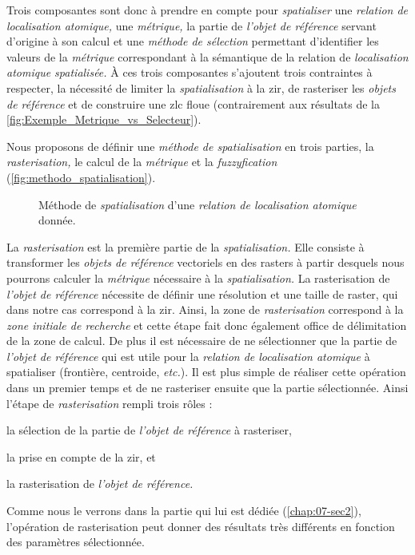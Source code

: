 
Trois composantes sont donc à prendre en compte pour
\emph{spatialiser} une \emph{relation de localisation atomique,} une
\emph{métrique,} la partie de \emph{l'objet de référence} servant
d'origine à son calcul et une \emph{méthode de sélection} permettant
d'identifier les valeurs de la \emph{métrique} correspondant à la
sémantique de la relation de \emph{localisation atomique spatialisée.}
À ces trois composantes s'ajoutent trois contraintes à respecter, la
nécessité de limiter la \emph{spatialisation} à la \ac{zir}, de
rasteriser les \emph{objets de référence} et de construire une
\ac{zlc} floue (contrairement aux résultats de la
\autoref{fig:Exemple_Metrique_vs_Selecteur}).

Nous proposons de définir une \emph{méthode de spatialisation} en
trois parties, la \emph{rasterisation,} le calcul de la
\emph{métrique} et la \emph{fuzzyfication}
(\autoref{fig:methodo_spatialisation}).

\begin{figure}
  \centering
  
  \caption{Méthode de \emph{spatialisation} d'une \emph{relation de
      localisation atomique} donnée.}
  \label{fig:methodo_spatialisation}
\end{figure}

La \emph{rasterisation} est la première partie de la
\emph{spatialisation.} Elle consiste à transformer les \emph{objets de
  référence} vectoriels en des rasters à partir desquels nous pourrons
calculer la \emph{métrique} nécessaire à la \emph{spatialisation.} La
rasterisation de \emph{l'objet de référence} nécessite de définir une
résolution et une taille de raster, qui dans notre cas correspond à la
\ac{zir}. Ainsi, la zone de \emph{rasterisation} correspond à la
\emph{zone initiale de recherche} et cette étape fait donc également
office de délimitation de la zone de calcul. De plus il est nécessaire
de ne sélectionner que la partie de \emph{l'objet de référence} qui
est utile pour la \emph{relation de localisation atomique} à
spatialiser (\eg frontière, centroide, \emph{etc.}). Il est plus
simple de réaliser cette opération dans un premier temps et de ne
rasteriser ensuite que la partie sélectionnée. Ainsi l'étape de
\emph{rasterisation} rempli trois rôles :
%
\begin{enumerate*}[label=(\alph*)]
\item la sélection de la partie de \emph{l'objet de référence} à rasteriser,
\item la prise en compte de la \ac{zir}, et
\item la rasterisation de \emph{l'objet de référence.}  
\end{enumerate*}
%
Comme nous le verrons dans la partie qui lui est dédiée
(\autoref{chap:07-sec2}), l'opération de rasterisation peut donner des
résultats très différents en fonction des paramètres sélectionnée.

